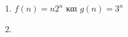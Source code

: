 \documentclass[12pt]{article}
\begin{document}
\begin{enumerate}[label=(\greek*)]
                                                                                                                                                                                                                                                                                                                                                                                                                                                                                                                                                                                                                                                                                                                                                                                                                                                                            
        \item $f(n) = n2^n$\: και \:$g(n) = 3^n$
        
        \item 
        

\end{enumerate}
\end{document}
